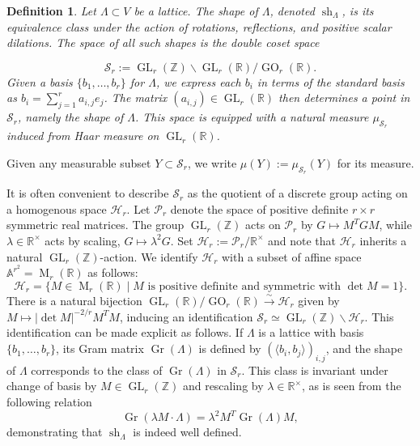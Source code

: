 \documentclass[table]{amsart}
\newtheorem{definition}[theorem]{Definition}
\newcommand{\cH}{\mathcal{H}}
\newcommand{\op}[1]{\operatorname{#1}}
\numberwithin{equation}{section}
\begin{document}
\begin{definition}
Let $\Lambda \subset V$ be a lattice. The \emph{shape} of $\Lambda$, denoted $\operatorname{sh}_\Lambda$, is its equivalence class under the action of rotations, reflections, and positive scalar dilations. The space of all such shapes is the double coset space

$$
\mathcal{S}_r := \operatorname{GL}_r(\mathbb{Z}) \backslash \operatorname{GL}_r(\mathbb{R}) / \operatorname{GO}_r(\mathbb{R}).
$$
\noindent Given a basis $\{b_1, \dots, b_r\}$ for $\Lambda$, we express each $b_i$ in terms of the standard basis as $b_i = \sum_{j=1}^r a_{i,j} e_j$. The matrix $(a_{i,j}) \in \operatorname{GL}_r(\mathbb{R})$ then determines a point in $\mathcal{S}_r$, namely the shape of $\Lambda$. This space is equipped with a natural measure $\mu_{\mathcal{S}_r}$ induced from Haar measure on $\operatorname{GL}_r(\mathbb{R})$.
\end{definition}
\noindent Given any measurable subset $Y \subset \mathcal{S}_r$, we write $\mu(Y) := \mu_{\mathcal{S}_r}(Y)$ for its measure.
\par It is often convenient to describe $\mathcal{S}_r$ as the quotient of a discrete group acting on a homogenous space $\cH_r$. Let $\mathcal{P}_r$ denote the space of positive definite $r \times r$ symmetric real matrices. The group $\operatorname{GL}_r(\mathbb{Z})$ acts on $\mathcal{P}_r$ by $G \mapsto M^T G M$, while $\lambda\in \mathbb{R}^\times$ acts by scaling, $G \mapsto \lambda^2 G$. Set $\cH_r:=\mathcal{P}_r/\mathbb{R}^\times$ and note that $\cH_r$ inherits a natural $\operatorname{GL}_r(\mathbb{Z})$-action. We identify $\cH_r$ with a subset of affine space $\mathbb{A}^{r^2}=\op{M}_r(\mathbb{R})$ as follows:
\[\cH_r=\{M\in \op{M}_r(\mathbb{R})\mid M\text{ is positive definite and symmetric with }\det M=1\}.\]There is a natural bijection $\operatorname{GL}_r(\mathbb{R}) / \operatorname{GO}_r(\mathbb{R}) \xrightarrow{\sim} \mathcal{H}_r$ given by $M \mapsto |\det M|^{-2/r} M^T M$, inducing an identification $\mathcal{S}_r \simeq \operatorname{GL}_r(\mathbb{Z}) \backslash \mathcal{H}_r$. This identification can be made explicit as follows. If $\Lambda$ is a lattice with basis $\{b_1, \dots, b_r\}$, its Gram matrix $\operatorname{Gr}(\Lambda)$ is defined by $(\langle b_i, b_j \rangle)_{i,j}$, and the shape of $\Lambda$ corresponds to the class of $\operatorname{Gr}(\Lambda)$ in $\mathcal{S}_r$. This class is invariant under change of basis by $M \in \operatorname{GL}_r(\mathbb{Z})$ and rescaling by $\lambda \in \mathbb{R}^\times$, as is seen from the following relation
$$
\operatorname{Gr}(\lambda M \cdot \Lambda) = \lambda^2 M^T \operatorname{Gr}(\Lambda) M,
$$
\noindent demonstrating that $\operatorname{sh}_\Lambda$ is indeed well defined.
\end{document}
